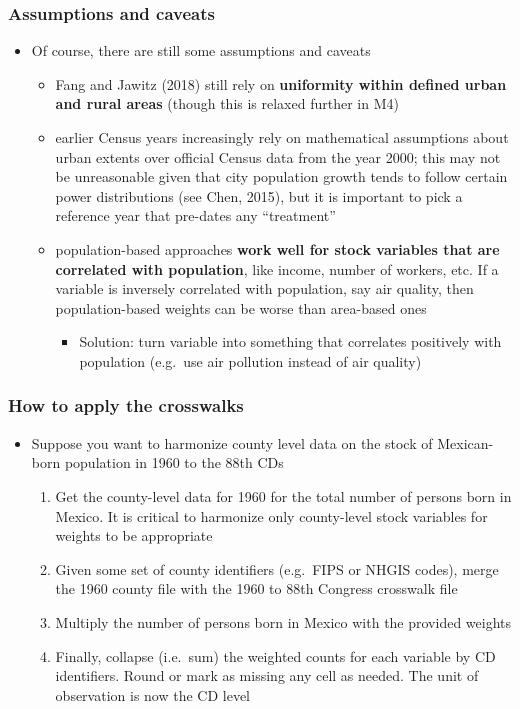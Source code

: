 \documentclass{beamer}
\begin{document}
\begin{frame}
\frametitle{Assumptions and caveats}

\begin{itemize}
    \item Of course, there are still some assumptions and caveats
    \begin{itemize}
        \item Fang and Jawitz (2018) still rely on \textbf{uniformity within defined urban and rural areas} (though this is relaxed further in M4)
        \item earlier Census years increasingly rely on mathematical assumptions about urban extents over official Census data from the year 2000; this may not be unreasonable given that city population growth tends to follow certain power distributions (see Chen, 2015), but it is important to pick a reference year that pre-dates any ``treatment''
        \item population-based approaches \textbf{work well for stock variables that are correlated with population}, like income, number of workers, etc. If a variable is inversely correlated with population, say air quality, then population-based weights can be worse than area-based ones
        \begin{itemize}
            \item Solution: turn variable into something that correlates positively with population (e.g.\ use air pollution instead of air quality)
        \end{itemize}
    \end{itemize}
\end{itemize}

\end{frame}


\begin{frame}
\frametitle{How to apply the crosswalks}
\begin{itemize}
    \item Suppose you want to harmonize county level data on the stock of Mexican-born population in 1960 to the 88th CDs
    \begin{enumerate}
        \item Get the county-level data for 1960 for the total number of persons born in Mexico. It is critical to harmonize only county-level stock variables for weights to be appropriate
        \item Given some set of county identifiers (e.g.\ FIPS or NHGIS codes), merge the 1960 county file with the 1960 to 88th Congress crosswalk file
        \item Multiply the number of persons born in Mexico with the provided weights
        \item Finally, collapse (i.e.\ sum) the weighted counts for each variable by CD identifiers. Round or mark as missing any cell as needed. The unit of observation is now the CD level
    \end{enumerate}
\end{itemize}

\end{frame}
\end{document}
